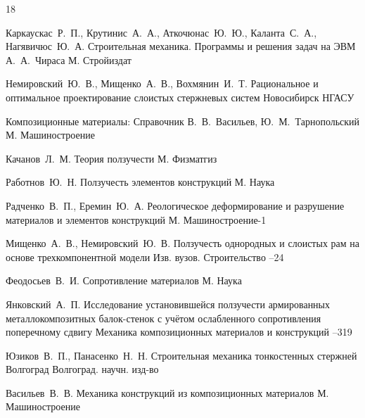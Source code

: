 \RusRef

\begin{thebibliography}{18}


\by    Каркаускас~Р.~П., Крутинис~А.~А., Аткочюнас~Ю.~Ю., Каланта~С.~А.,  Нагявичюс~Ю.~А.
\book Строительная механика. Программы и решения задач на ЭВМ
\ed А.~А.~Чираса
\publaddr М.
\publ Стройиздат

\by Немировский~Ю.~В., Мищенко~А.~В., Вохмянин~И.~Т.
\book Рациональное и оптимальное проектирование слоистых стержневых систем
\publaddr Новосибирск
\publ НГАСУ

\book Композиционные материалы: Справочник
\ed В.~В.~Васильев, Ю.~М.~Тарнопольский
\publaddr М.
\publ Машиностроение

\by Качанов~Л.~М.
\book Теория ползучести
\publaddr М.
\publ Физматгиз

\by Работнов~Ю.~Н.
\book Ползучесть элементов конструкций
\publaddr М.
\publ Наука


\by Радченко~В.~П., Еремин~Ю.~А.
\book Реологическое деформирование и разрушение материалов и элементов конструкций
\publaddr М.
\publ Машиностроение-1


\by  Мищенко~А.~В., Немировский~Ю.~В.
\paper Ползучесть однородных и слоистых рам на основе трехкомпонентной модели
\jour Изв. вузов. Строительство
--24

\by Феодосьев~В.~И.
\book Сопротивление материалов
\publaddr М.
\publ Наука


\by Янковский~А.~П.
\paper Исследование установившейся ползучести армированных металлокомпозитных балок-стенок с учётом ослабленного сопротивления поперечному сдвигу
\jour Механика композиционных материалов и конструкций
--319

\by Юзиков~В.~П., Панасенко~Н.~Н.
\book Строительная механика тонкостенных стержней
\publaddr Волгоград
\publ Волгоград. научн. изд-во


\by Васильев~В.~В.
\book Механика конструкций из композиционных материалов
\publaddr М.
\publ Машиностроение



\end{thebibliography}
